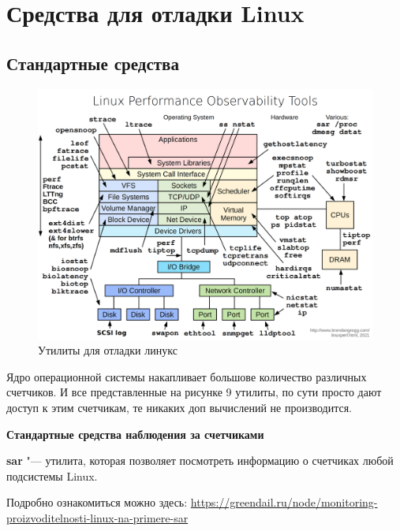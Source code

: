\documentclass[bachelor, och, book]{SCWorks}
\theoremstyle{remark}
\begin{document}
    \section{Средства для отладки Linux}
    \subsection{Стандартные средства}
    \begin{figure}[H]
        \begin{center}
            \includegraphics[scale=0.2]{res/linux-observability-tools.png}
            \caption{Утилиты для отладки линукс}
        \end{center}
    \end{figure}

    Ядро операционной системы накапливает большове количество различных счетчиков. И все представленные на рисунке 9 утилиты, по сути просто дают доступ к этим счетчикам, те никаких доп вычислений не производится.


    \begin{center}
        \textbf{Стандартные средства наблюдения за счетчиками}
    \end{center}

    \textbf{sar} "--- утилита, которая позволяет посмотреть информацию о счетчиках любой подсистемы Linux. 

    Подробно ознакомиться можно здесь:  \href{https://greendail.ru/node/monitoring-proizvoditelnosti-linux-na-primere-sar}{https://greendail.ru/node/monitoring-proizvoditelnosti-linux-na-primere-sar}
\end{document}
